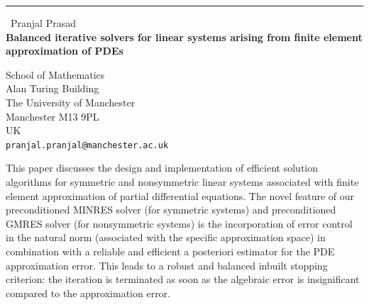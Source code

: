 \documentclass{report}
\begin{document}
\begin{center}
\rule{6in}{1pt} \
{\large Pranjal Prasad \\
{\bf Balanced iterative solvers for {linear systems} arising from finite element approximation of PDEs}}

School of Mathematics \\ Alan Turing Building \\ The University of Manchester \\ Manchester M13 9PL \\ UK
\\
{\tt pranjal.pranjal@manchester.ac.uk}\end{center}

This paper discusses the design and implementation of
efficient solution algorithms for symmetric and nonsymmetric
linear systems associated with finite element approximation of partial
differential equations. The novel feature of our preconditioned MINRES
solver (for symmetric systems) and preconditioned GMRES solver (for
nonsymmetric systems) is
the incorporation of error control in the natural norm (associated with
the specific approximation space) in combination with {a reliable and
efficient} a posteriori estimator for the PDE approximation error. This
leads to a robust
and balanced inbuilt stopping criterion: the iteration is terminated as
soon as the algebraic error is insignificant compared to the
approximation error.
\end{document}
